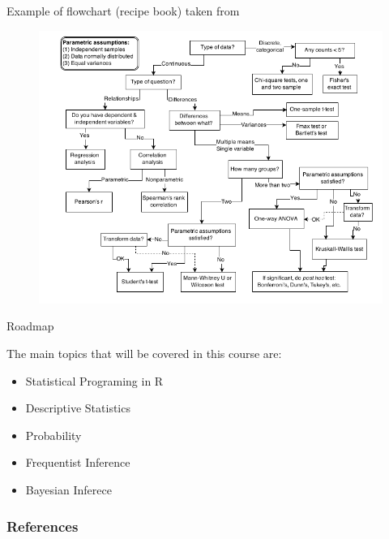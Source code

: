 \documentclass[handout]{beamer}
\begin{document}
\begin{frame}{Example of flowchart (recipe book) taken from \cite{mcelreath2020statistical}} 


\begin{figure}[h!]
	\centering
	\includegraphics[scale=0.38]{pics/flowchart.png}
\end{figure}


 
\end{frame}

\begin{frame}{Roadmap}

\scriptsize{
The main topics that will be covered in this course are:
\begin{itemize}
\item Statistical Programing in R
\item Descriptive Statistics
\item Probability
\item Frequentist Inference
\item Bayesian Inferece
\end{itemize}

}
 
\end{frame}


\begin{frame}[allowframebreaks]\scriptsize
\frametitle{References}


%
\end{frame}  









\end{document}
